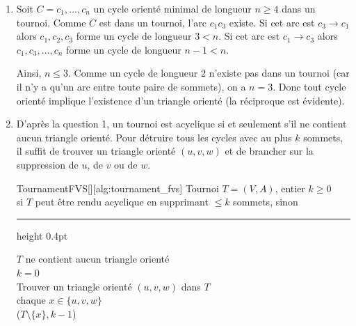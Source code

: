 \begin{td-sol}
    \begin{enumerate}
        \item Soit \(C = c_1,\ldots,c_n\) un cycle orienté minimal de longueur \(n\geq 4\) dans un tournoi.
        Comme \(C\) est dans un tournoi, l'arc \(c_1c_3\) existe.
        Si cet arc est \(c_3 \to c_1\) alors \(c_1,c_2,c_3\) forme un cycle de longueur \(3 < n\).
        Si cet arc est \(c_1 \to c_3\) alors \(c_1,c_3,\ldots,c_n\) forme un cycle de longueur \(n-1 < n\).

        Ainsi, \(n \leq 3\).
        Comme un cycle de longueur \(2\) n'existe pas dans un tournoi (car il n'y a qu'un arc entre toute paire de sommets), on a \(n=3\).
        Donc tout cycle orienté implique l'existence d'un triangle orienté (la réciproque est évidente).

        \item D'après la question 1, un tournoi est acyclique si et seulement s'il ne contient aucun triangle orienté. Pour détruire tous les cycles avec au plus \(k\) sommets, il suffit de trouver un triangle orienté \((u, v, w)\) et de brancher sur la suppression de \(u\), de \(v\) ou de \(w\).

        \begin{cleanalgo}{TournamentFVS}[][alg:tournament_fvs]
             Tournoi \(T = (V, A)\), entier \(k \ge 0\) \\
              si \(T\) peut être rendu acyclique en supprimant \(\le k\) sommets,  sinon \\[4pt]
            {\color{AlgoBorder}\hrule height 0.4pt}\vspace{6pt}
             \(T\) ne contient aucun triangle orienté   \\
             \(k = 0\)   \\[4pt]
            Trouver un triangle orienté \((u, v, w)\) dans \(T\)  \\
             chaque \(x \in \{u, v, w\}\)  \\
            \I {} (\(T \setminus \{x\}, k - 1\))  \\
            \II {}  \\
            \I {} \\
             \\
             
        \end{cleanalgo}


\end{enumerate}
\end{td-sol}
